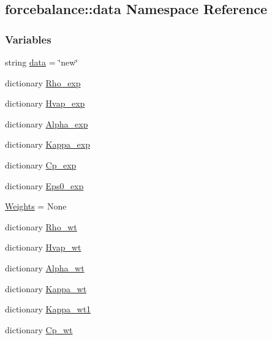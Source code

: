 \hypertarget{namespaceforcebalance_1_1data}{\subsection{forcebalance\-:\-:data \-Namespace \-Reference}
\label{namespaceforcebalance_1_1data}
}
\subsubsection*{\-Variables}
\begin{DoxyCompactItemize}
\item 
string \hyperlink{namespaceforcebalance_1_1data_a3f325d696a5bf504db1219d69a4e5a43}{data} = \char`\"{}new\char`\"{}
\item 
dictionary \hyperlink{namespaceforcebalance_1_1data_adc1abf955f8b53a4451b5e409d1cb48e}{\-Rho\-\_\-exp}
\item 
dictionary \hyperlink{namespaceforcebalance_1_1data_acf4e892b022db3fee4b5fd4c9ce3f13f}{\-Hvap\-\_\-exp}
\item 
dictionary \hyperlink{namespaceforcebalance_1_1data_aa22aaf25066bf8d28b16de90a229ab14}{\-Alpha\-\_\-exp}
\item 
dictionary \hyperlink{namespaceforcebalance_1_1data_a5be737681ad8bd07bb6f3468a3894dec}{\-Kappa\-\_\-exp}
\item 
dictionary \hyperlink{namespaceforcebalance_1_1data_a05528f17d34352e3993ef0ffbc5f45f5}{\-Cp\-\_\-exp}
\item 
dictionary \hyperlink{namespaceforcebalance_1_1data_a27f89d8e25ee5771a00f60c8601ea06e}{\-Eps0\-\_\-exp}
\item 
\hyperlink{namespaceforcebalance_1_1data_a56682bb9f72fbaf228f67a9b7c3b260c}{\-Weights} = \-None
\item 
dictionary \hyperlink{namespaceforcebalance_1_1data_a215c92b741d8fdf8d1d207f4ba004757}{\-Rho\-\_\-wt}
\item 
dictionary \hyperlink{namespaceforcebalance_1_1data_aef2b70671bb97513a6bfd4e85e6b7a04}{\-Hvap\-\_\-wt}
\item 
dictionary \hyperlink{namespaceforcebalance_1_1data_ac28ea53dfde9bd9108ff2b1d5205c454}{\-Alpha\-\_\-wt}
\item 
dictionary \hyperlink{namespaceforcebalance_1_1data_a5d46dc3c4f4d9b28b236f58233a5a7f2}{\-Kappa\-\_\-wt}
\item 
dictionary \hyperlink{namespaceforcebalance_1_1data_ad221cfaf38dccc85761eb1776a3f575d}{\-Kappa\-\_\-wt1}
\item 
dictionary \hyperlink{namespaceforcebalance_1_1data_aaf9b38b123578380133a90c041d25f8b}{\-Cp\-\_\-wt}
\end{DoxyCompactItemize}


